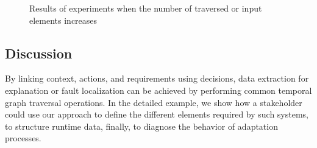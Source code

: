 \begin{figure}
	\centering
	\hfil
	\centering
\caption{Results of experiments when the number of traversed or input elements  increases}
\label{fig:exp-res}
\end{figure}

\subsection{Discussion}
By linking context, actions, and requirements using decisions, data extraction for explanation or fault localization can be achieved by performing common temporal graph traversal operations.
In the detailed example, we show how a stakeholder could use our approach to define the different elements required by such systems, to structure runtime data, finally, to diagnose the behavior of adaptation processes. 

